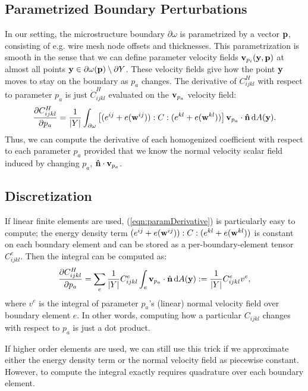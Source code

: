 \documentclass[10pt]{article}
\providecommand{\dA}{\, \mathrm{d}A}
\providecommand{\pder}[2]{\frac{\partial #1}{\partial #2}}
\begin{document}
\subsection{Parametrized Boundary Perturbations}
In our setting, the microstructure boundary $\partial \omega$ is parametrized by a vector ${\bf p}$,
consisting of e.g. wire mesh node offsets and thicknesses. This parametrization is smooth
in the sense that we can define parameter velocity fields ${\bf v}_{p_i}({\bf y}, {\bf
p})$ at almost all points ${\bf y} \in \partial \omega({\bf p}) \setminus \partial Y$.
These velocity fields give how the point ${\bf y}$ moves to stay on the
boundary as $p_a$ changes. The derivative of $C^H_{ijkl}$ with respect to
parameter $p_a$ is just $\dot{C}^H_{ijkl}$ evaluated on the ${\bf v}_{p_a}$
velocity field:
\begin{equation}
\label{eqn:paramDerivative}
\pder{C^H_{ijkl}}{p_a} =
\frac{1}{|Y|} \int_{\partial \omega} \left[(e^{ij} + e({\bf w}^{ij})) : C : (e^{kl} + e({\bf w}^{kl}))\right] {\bf v}_{p_a} \cdot {\bf \hat{n}} \dA({\bf y}).
\end{equation}
Thus, we can compute the derivative of each homogenized coefficient with
respect to each parameter $p_a$ provided that we know the normal velocity
scalar field induced by changing $p_a$, ${\bf \hat{n}} \cdot {\bf v}_{p_a}$.

\subsection{Discretization}
If linear finite elements are used, (\ref{eqn:paramDerivative}) is
particularly easy to compute; the energy density term
$(e^{ij} + e({\bf w}^{ij})) : C : (e^{kl} + e({\bf w}^{kl}))$
is constant on each boundary element and can be stored as a per-boundary-element tensor $C^e_{ijkl}$.
Then the integral can be computed as:
$$
\pder{C^H_{ijkl}}{p_a} =
\sum_e \frac{1}{|Y|} C^e_{ijkl} \int_e {\bf v}_{p_a} \cdot \hat{{\bf n}} \dA({\bf y}) := \frac{1}{|Y|} C^e_{ijkl} v^e,
$$
where $v^e$ is the integral of parameter $p_a$'s (linear) normal velocity field
over boundary element $e$. In other words, computing how a particular
$C_{ijkl}$ changes with respect to $p_a$ is just a dot product.

If higher order elements are used, we can still use this trick if we
approximate either the energy density term or the normal velocity field as
piecewise constant. However, to compute the integral exactly requires
quadrature over each boundary element.
\end{document}
